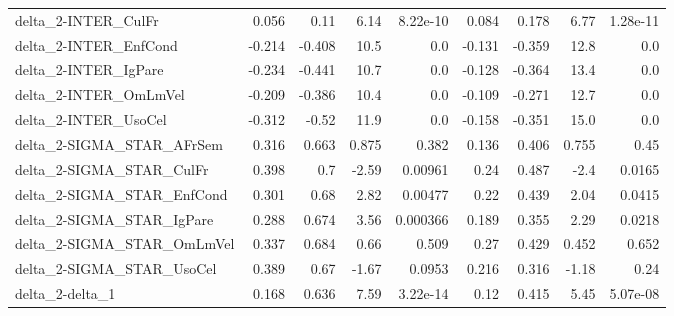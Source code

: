 \begin{tabular}{lrrrrrrrr}
delta\_2-INTER\_CulFr                   &       0.056 &         0.11 &    6.14 & 8.22e-10 &      0.084 &       0.178 &         6.77 &      1.28e-11 \\
delta\_2-INTER\_EnfCond                 &      -0.214 &       -0.408 &    10.5 &      0.0 &     -0.131 &      -0.359 &         12.8 &           0.0 \\
delta\_2-INTER\_IgPare                  &      -0.234 &       -0.441 &    10.7 &      0.0 &     -0.128 &      -0.364 &         13.4 &           0.0 \\
delta\_2-INTER\_OmLmVel                 &      -0.209 &       -0.386 &    10.4 &      0.0 &     -0.109 &      -0.271 &         12.7 &           0.0 \\
delta\_2-INTER\_UsoCel                  &      -0.312 &        -0.52 &    11.9 &      0.0 &     -0.158 &      -0.351 &         15.0 &           0.0 \\
delta\_2-SIGMA\_STAR\_AFrSem             &       0.316 &        0.663 &   0.875 &    0.382 &      0.136 &       0.406 &        0.755 &          0.45 \\
delta\_2-SIGMA\_STAR\_CulFr              &       0.398 &          0.7 &   -2.59 &  0.00961 &       0.24 &       0.487 &         -2.4 &        0.0165 \\
delta\_2-SIGMA\_STAR\_EnfCond            &       0.301 &         0.68 &    2.82 &  0.00477 &       0.22 &       0.439 &         2.04 &        0.0415 \\
delta\_2-SIGMA\_STAR\_IgPare             &       0.288 &        0.674 &    3.56 & 0.000366 &      0.189 &       0.355 &         2.29 &        0.0218 \\
delta\_2-SIGMA\_STAR\_OmLmVel            &       0.337 &        0.684 &    0.66 &    0.509 &       0.27 &       0.429 &        0.452 &         0.652 \\
delta\_2-SIGMA\_STAR\_UsoCel             &       0.389 &         0.67 &   -1.67 &   0.0953 &      0.216 &       0.316 &        -1.18 &          0.24 \\
delta\_2-delta\_1                       &       0.168 &        0.636 &    7.59 & 3.22e-14 &       0.12 &       0.415 &         5.45 &      5.07e-08 \\
\bottomrule
\end{tabular}

